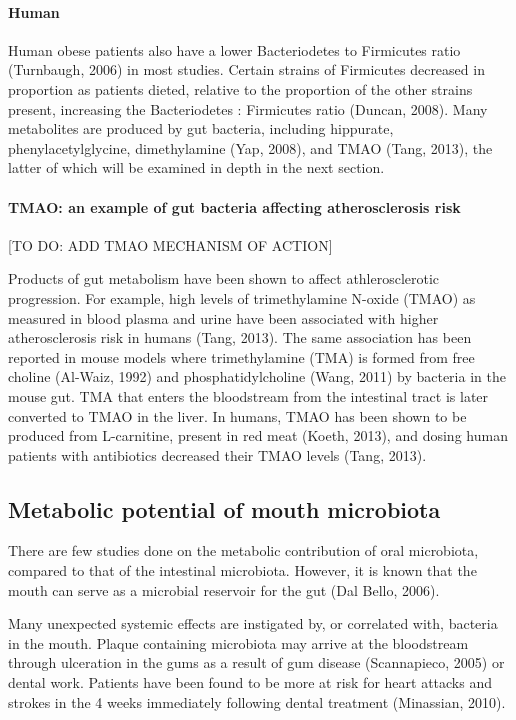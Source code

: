 \paragraph{Human}
Human obese patients also have a lower Bacteriodetes to Firmicutes ratio (Turnbaugh, 2006) in most studies. Certain strains of Firmicutes decreased in proportion as patients dieted, relative to the proportion of the other strains present, increasing the Bacteriodetes : Firmicutes ratio (Duncan, 2008). Many metabolites are produced by gut bacteria, including hippurate, phenylacetylglycine, dimethylamine (Yap, 2008), and TMAO (Tang, 2013), the latter of which will be examined in depth in the next section.

\paragraph{TMAO: an example of gut bacteria affecting atherosclerosis risk}
[TO DO: ADD TMAO MECHANISM OF ACTION]

Products of gut metabolism have been shown to affect athlerosclerotic progression. For example, high levels of trimethylamine N-oxide (TMAO) as measured in blood plasma and urine have been associated with higher atherosclerosis risk in humans (Tang, 2013). The same association has been reported in mouse models where trimethylamine (TMA) is formed from free choline (Al-Waiz, 1992) and phosphatidylcholine (Wang, 2011) by bacteria in the mouse gut. TMA that enters the bloodstream from the intestinal tract is later converted to TMAO in the liver. In humans, TMAO has been shown to be produced from L-carnitine, present in red meat (Koeth, 2013), and dosing human patients with antibiotics decreased their TMAO levels (Tang, 2013).

\subsection{Metabolic potential of mouth microbiota}
There are few studies done on the metabolic contribution of oral microbiota, compared to that of the intestinal microbiota. However, it is known that the mouth can serve as a microbial reservoir for the gut (Dal Bello, 2006).

Many unexpected systemic effects are instigated by, or correlated with, bacteria in the mouth. Plaque containing microbiota may arrive at the bloodstream through ulceration in the gums as a result of gum disease (Scannapieco, 2005) or dental work. Patients have been found to be more at risk for heart attacks and strokes in the 4 weeks immediately following dental treatment (Minassian, 2010).

